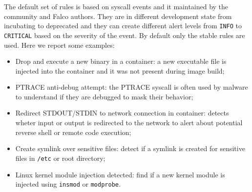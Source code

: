 The default set of rules\cite{falcoRules} is based on syscall events and it maintained by the community and Falco authors. They are in different development state from incubating to deprecated and they can create different alert levels from \texttt{INFO} to \texttt{CRITICAL} based on the severity of the event. By default only the stable rules are used. Here we report some examples:
\begin{itemize}
    \item Drop and execute a new binary in a container: a new executable file is injected into the container and it was not present during image build;
    \item PTRACE anti-debug attempt: the PTRACE syscall is often used by malware to understand if they are debugged to mask their behavior;
    \item Redirect STDOUT/STDIN to network connection in container: detects wheter input or output is redirected to the network to alert about potential reverse shell or remote code execution;
    \item Create symlink over sensitive files: detect if a symlink is created for sensitive files in \texttt{/etc} or root directory;
    \item Linux kernel module injection detected: find if a new kernel module is injected using \texttt{insmod} or \texttt{modprobe}.
\end{itemize}



